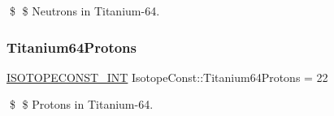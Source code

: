 \$ \$ Neutrons in Titanium-\/64. \mbox{\label{group___isotope_const-_titanium-_ti64_ga241528d25a923bcf5f725fc919075408}} 
\subsubsection{\texorpdfstring{Titanium64\+Protons}{Titanium64Protons}}
{\footnotesize\ttfamily \mbox{\hyperlink{group___isotope_const-_macros_ga5f18360b3e99483a35c32d789e62621c}{I\+S\+O\+T\+O\+P\+E\+C\+O\+N\+S\+T\+\_\+\+I\+NT}} Isotope\+Const\+::\+Titanium64\+Protons = 22}

\$ \$ Protons in Titanium-\/64. 